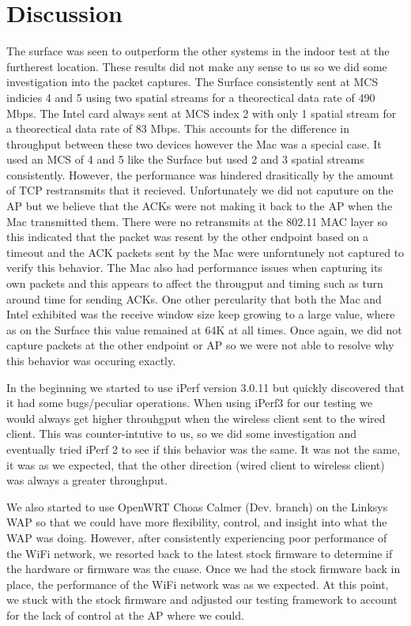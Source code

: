 \section{Discussion}

The surface was seen to outperform the other systems in the indoor test at the furtherest location. These results did not make any sense to us so we did some investigation into the packet captures. The Surface consistently sent at MCS indicies 4 and 5 using two spatial streams for a theorectical data rate of 490 Mbps. The Intel card always sent at MCS index 2 with only 1 spatial stream for a theorectical data rate of 83 Mbps. This accounts for the difference in throughput between these two devices however the Mac was a special case. It used an MCS of 4 and 5 like the Surface but used 2 and 3 spatial streams consistently. However, the performance was hindered drasitically by the amount of TCP restransmits that it recieved. Unfortunately we did not caputure on the AP but we believe that the ACKs were not making it back to the AP when the Mac transmitted them. There were no retransmits at the 802.11 MAC layer so this indicated that the packet was resent by the other endpoint based on a timeout and the ACK packets sent by the Mac were unforntunely not captured to verify this behavior. The Mac also had performance issues when capturing its own packets and this appears to affect the througput and timing such as turn around time for sending ACKs. One other percularity that both the Mac and Intel exhibited was the receive window size keep growing to a large value, where as on the Surface this value remained at 64K at all times. Once again, we did not capture packets at the other endpoint or AP so we were not able to resolve why this behavior was occuring exactly.

In the beginning we started to use iPerf version 3.0.11 but quickly discovered that it had some bugs/peculiar operations. When using iPerf3 for our testing we would always get higher throuhgput when the wireless client sent to the wired client. This was counter-intutive to us, so we did some investigation and eventually tried iPerf 2 to see if this behavior was the same. It was not the same, it was as we expected, that the other direction (wired client to wireless client) was always a greater throughput. 

We also started to use OpenWRT Choas Calmer (Dev. branch) on the Linksys WAP so that we could have more flexibility, control, and insight into what the WAP was doing. However, after consistently experiencing poor performance of the WiFi network, we resorted back to the latest stock firmware to determine if the hardware or firmware was the cuase. Once we had the stock firmware back in place, the performance of the WiFi network was as we expected. At this point, we stuck with the stock firmware and adjusted our testing framework to account for the lack of control at the AP where we could.
